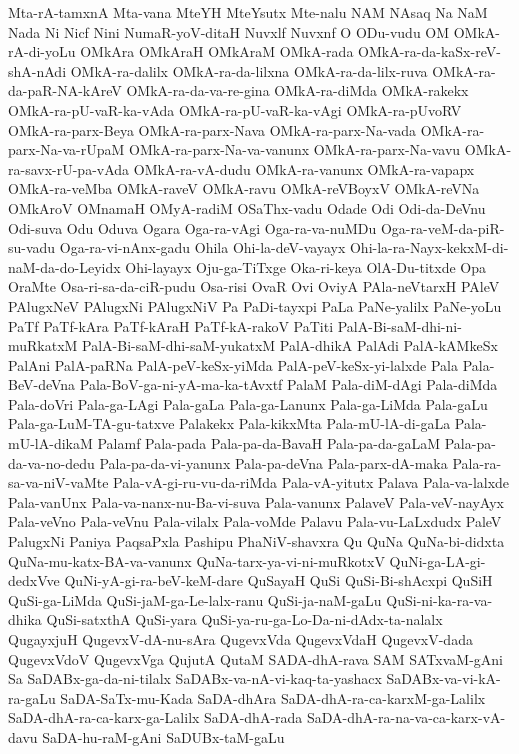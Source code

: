 {Mta-rA-tamxnA
Mta-vana
MteYH
MteYsutx
Mte-nalu
NAM
NAsaq
Na
NaM
Nada
Ni
Nicf
Nini
NumaR-yoV-ditaH
Nuvxlf
Nuvxnf
O
ODu-vudu
OM
OMkA-rA-di-yoLu
OMkAra
OMkAraH
OMkAraM
OMkA-rada
OMkA-ra-da-kaSx-reV-shA-nAdi
OMkA-ra-dalilx
OMkA-ra-da-lilxna
OMkA-ra-da-lilx-ruva
OMkA-ra-da-paR-NA-kAreV
OMkA-ra-da-va-re-gina
OMkA-ra-diMda
OMkA-rakekx
OMkA-ra-pU-vaR-ka-vAda
OMkA-ra-pU-vaR-ka-vAgi
OMkA-ra-pUvoRV
OMkA-ra-parx-Beya
OMkA-ra-parx-Nava
OMkA-ra-parx-Na-vada
OMkA-ra-parx-Na-va-rUpaM
OMkA-ra-parx-Na-va-vanunx
OMkA-ra-parx-Na-vavu
OMkA-ra-savx-rU-pa-vAda
OMkA-ra-vA-dudu
OMkA-ra-vanunx
OMkA-ra-vapapx
OMkA-ra-veMba
OMkA-raveV
OMkA-ravu
OMkA-reVBoyxV
OMkA-reVNa
OMkAroV
OMnamaH
OMyA-radiM
OSaThx-vadu
Odade
Odi
Odi-da-DeVnu
Odi-suva
Odu
Oduva
Ogara
Oga-ra-vAgi
Oga-ra-va-nuMDu
Oga-ra-veM-da-piR-su-vadu
Oga-ra-vi-nAnx-gadu
Ohila
Ohi-la-deV-vayayx
Ohi-la-ra-Nayx-kekxM-di-naM-da-do-Leyidx
Ohi-layayx
Oju-ga-TiTxge
Oka-ri-keya
OlA-Du-titxde
Opa
OraMte
Osa-ri-sa-da-ciR-pudu
Osa-risi
OvaR
Ovi
OviyA
PAla-neVtarxH
PAleV
PAlugxNeV
PAlugxNi
PAlugxNiV
Pa
PaDi-tayxpi
PaLa
PaNe-yalilx
PaNe-yoLu
PaTf
PaTf-kAra
PaTf-kAraH
PaTf-kA-rakoV
PaTiti
PalA-Bi-saM-dhi-ni-muRkatxM
PalA-Bi-saM-dhi-saM-yukatxM
PalA-dhikA
PalAdi
PalA-kAMkeSx
PalAni
PalA-paRNa
PalA-peV-keSx-yiMda
PalA-peV-keSx-yi-lalxde
Pala
Pala-BeV-deVna
Pala-BoV-ga-ni-yA-ma-ka-tAvxtf
PalaM
Pala-diM-dAgi
Pala-diMda
Pala-doVri
Pala-ga-LAgi
Pala-gaLa
Pala-ga-Lanunx
Pala-ga-LiMda
Pala-gaLu
Pala-ga-LuM-TA-gu-tatxve
Palakekx
Pala-kikxMta
Pala-mU-lA-di-gaLa
Pala-mU-lA-dikaM
Palamf
Pala-pada
Pala-pa-da-BavaH
Pala-pa-da-gaLaM
Pala-pa-da-va-no-dedu
Pala-pa-da-vi-yanunx
Pala-pa-deVna
Pala-parx-dA-maka
Pala-ra-sa-va-niV-vaMte
Pala-vA-gi-ru-vu-da-riMda
Pala-vA-yitutx
Palava
Pala-va-lalxde
Pala-vanUnx
Pala-va-nanx-nu-Ba-vi-suva
Pala-vanunx
PalaveV
Pala-veV-nayAyx
Pala-veVno
Pala-veVnu
Pala-vilalx
Pala-voMde
Palavu
Pala-vu-LaLxdudx
PaleV
PalugxNi
Paniya
PaqsaPxla
Pashipu
PhaNiV-shavxra
Qu
QuNa
QuNa-bi-didxta
QuNa-mu-katx-BA-va-vanunx
QuNa-tarx-ya-vi-ni-muRkotxV
QuNi-ga-LA-gi-dedxVve
QuNi-yA-gi-ra-beV-keM-dare
QuSayaH
QuSi
QuSi-Bi-shAcxpi
QuSiH
QuSi-ga-LiMda
QuSi-jaM-ga-Le-lalx-ranu
QuSi-ja-naM-gaLu
QuSi-ni-ka-ra-va-dhika
QuSi-satxthA
QuSi-yara
QuSi-ya-ru-ga-Lo-Da-ni-dAdx-ta-nalalx
QugayxjuH
QugevxV-dA-nu-sAra
QugevxVda
QugevxVdaH
QugevxV-dada
QugevxVdoV
QugevxVga
QujutA
QutaM
SADA-dhA-rava
SAM
SATxvaM-gAni
Sa
SaDABx-ga-da-ni-tilalx
SaDABx-va-nA-vi-kaq-ta-yashacx
SaDABx-va-vi-kA-ra-gaLu
SaDA-SaTx-mu-Kada
SaDA-dhAra
SaDA-dhA-ra-ca-karxM-ga-Lalilx
SaDA-dhA-ra-ca-karx-ga-Lalilx
SaDA-dhA-rada
SaDA-dhA-ra-na-va-ca-karx-vA-davu
SaDA-hu-raM-gAni
SaDUBx-taM-gaLu
}
